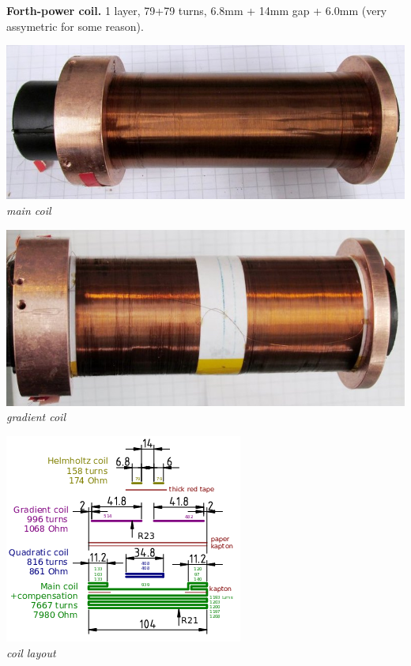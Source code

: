 \documentclass[a4paper]{article}
\begin{document}
{\bf Forth-power coil.} 1 layer, 79+79 turns, 6.8mm + 14mm gap + 6.0mm
(very assymetric for some reason).

\vbox{\noindent
\includegraphics[width=\linewidth]{img/main_coil.jpg}\\
{\it main coil}}

\vbox{\noindent
\includegraphics[width=\linewidth]{img/grad_coil.jpg}\\
{\it gradient coil}}

\vbox{\noindent
\includegraphics[width=\linewidth]{img/coil.png}\\
{\it coil layout}}
\end{document}
